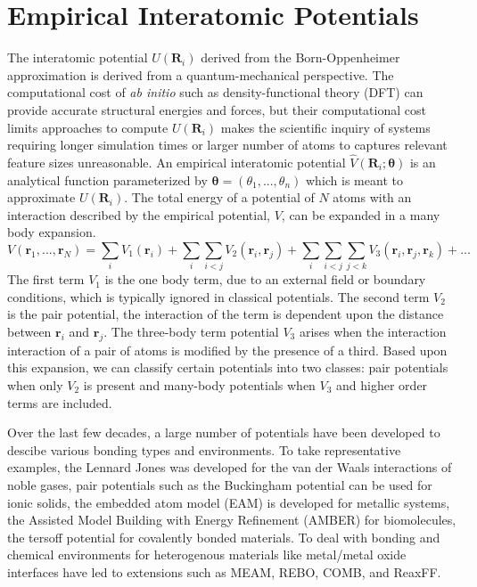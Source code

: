 \section{Empirical Interatomic Potentials}
The interatomic potential $U(\bm{R}_i)$ derived from the Born-Oppenheimer approximation is derived from a quantum-mechanical perspective.
The computational cost of \emph{ab initio} such as density-functional theory (DFT) can provide accurate structural energies and forces, but their computational cost limits approaches to compute $U(\bm{R}_i)$ makes the scientific inquiry of systems requiring longer simulation times or larger number of atoms to captures relevant feature sizes unreasonable.
An empirical interatomic potential $\hat{V}(\bm{R}_i;\bm{\theta})$ is an analytical function parameterized by $\bm{\theta}=(\theta_1,...,\theta_n)$ which is meant to approximate $U(\bm{R}_i)$.  
The total energy of a potential of $N$ atoms with an interaction described by the empirical potential, $V$, can be expanded in a many body expansion.
\begin{equation}
	V(\bm{r}_1,...,\bm{r}_N)= \sum_i V_1(\bm{r}_i)
	        + \sum_i \sum_{i<j} V_2(\bm{r}_i,\bm{r}_j)
				  + \sum_i \sum_{i<j} \sum_{j<k} V_3(\bm{r}_i,\bm{r}_j,\bm{r}_k) + ...
\end{equation}
The first term $V_1$ is the one body term, due to an external field or boundary conditions, which is typically ignored in classical potentials.  The second term $V_2$ is the pair potential, the interaction of the term is dependent upon the distance between $\bm{r}_i$ and $\bm{r}_j$.  The three-body term potential $V_3$ arises when the interaction interaction of a pair of atoms is modified by the presence of a third.  Based upon this expansion, we can classify certain potentials into two classes: pair potentials when only $V_2$ is present and many-body potentials when $V_3$ and higher order terms are included.

Over the last few decades, a large number of potentials have been developed to descibe various bonding types and environments.
To take representative examples, the Lennard Jones was developed for the van der Waals interactions of noble gases, pair potentials such as the Buckingham potential can be used for ionic solids, the embedded atom model (EAM) is developed for metallic systems, the Assisted Model Building with Energy Refinement (AMBER) for biomolecules, the tersoff potential for covalently bonded materials.
To deal with bonding and chemical environments for heterogenous materials like metal/metal oxide interfaces have led to extensions such as MEAM, REBO, COMB, and ReaxFF.

